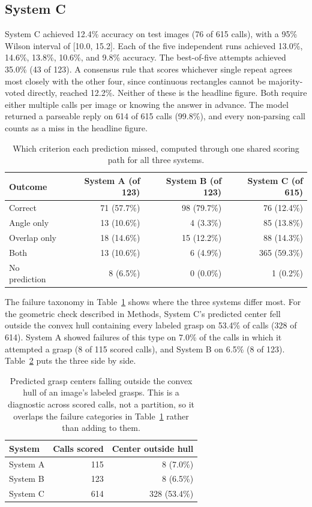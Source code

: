 \documentclass[12pt,letterpaper]{article}
\begin{document}
\subsection{System C}

System C achieved 12.4\% accuracy on test images (76 of 615 calls),
with a 95\% Wilson interval of [10.0, 15.2]. Each of the five
independent runs achieved 13.0\%, 14.6\%, 13.8\%, 10.6\%, and 9.8\%
accuracy. The best-of-five attempts achieved 35.0\% (43 of 123). A
consensus rule that scores whichever single repeat agrees most closely
with the other four, since continuous rectangles cannot be
majority-voted directly, reached 12.2\%. Neither of these is the
headline figure. Both require either multiple calls per image or
knowing the answer in advance. The model returned a parseable reply on
614 of 615 calls (99.8\%), and every non-parsing call counts as a miss
in the headline figure.

\begin{table}[H]
\centering
\caption{Which criterion each prediction missed, computed through one
shared scoring path for all three systems.}
\label{tab:taxonomy}
\begin{tabular}{lrrr}
\toprule
Outcome & System A (of 123) & System B (of 123) & System C (of 615) \\
\midrule
Correct       & 71 (57.7\%) & 98 (79.7\%) & 76 (12.4\%) \\
Angle only    & 13 (10.6\%) &  4 (3.3\%)  & 85 (13.8\%) \\
Overlap only  & 18 (14.6\%) & 15 (12.2\%) & 88 (14.3\%) \\
Both          & 13 (10.6\%) &  6 (4.9\%)  & 365 (59.3\%) \\
No prediction &  8 (6.5\%)  &  0 (0.0\%)  & 1 (0.2\%) \\
\bottomrule
\end{tabular}
\end{table}

The failure taxonomy in Table~\ref{tab:taxonomy} shows where the three
systems differ most. For the geometric check described in Methods,
System C's predicted center fell outside the convex hull containing
every labeled grasp on 53.4\% of calls (328 of 614). System A showed
failures of this type on 7.0\% of the calls in which it attempted a
grasp (8 of 115 scored calls), and System B on 6.5\% (8 of 123).
Table~\ref{tab:hull} puts the three side by side.

\begin{table}[H]
\centering
\caption{Predicted grasp centers falling outside the convex hull of an
image's labeled grasps. This is a diagnostic across scored calls, not a
partition, so it overlaps the failure categories in
Table~\ref{tab:taxonomy} rather than adding to them.}
\label{tab:hull}
\begin{tabular}{lrr}
\toprule
System & Calls scored & Center outside hull \\
\midrule
System A &  115 &   8 (7.0\%)  \\
System B &  123 &   8 (6.5\%)  \\
System C &  614 & 328 (53.4\%) \\
\bottomrule
\end{tabular}
\end{table}
\end{document}
